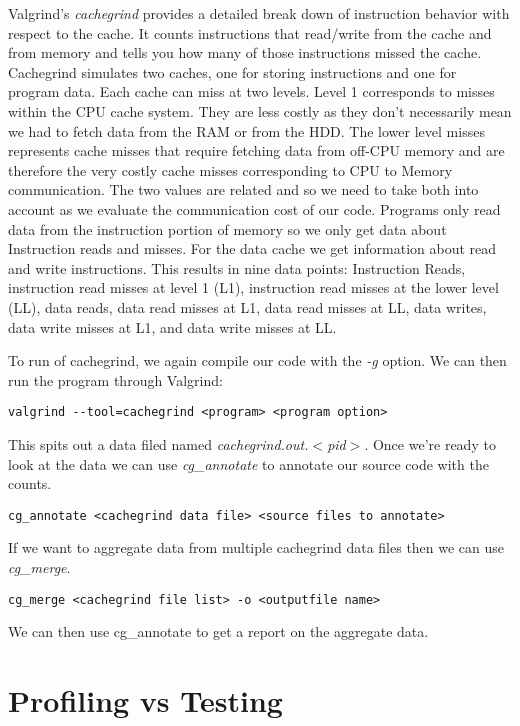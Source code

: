 \documentclass[]{tufte-handout}
\begin{document}
Valgrind's \textit{cachegrind} provides a detailed break down of instruction behavior with respect to the cache. It counts instructions that read/write from the cache and from memory and tells you how many of those instructions missed the cache. Cachegrind simulates two caches, one for storing instructions and one for program data.  Each cache can miss at two levels. Level 1 corresponds to misses within the CPU cache system. They are less costly as they don't necessarily mean we had to fetch data from the RAM or from the HDD.  The lower level misses represents cache misses that require fetching data from off-CPU memory and are therefore the very costly cache misses corresponding to CPU to Memory communication.  The two values are related and so we need to take both into account as we evaluate the communication cost of our code. Programs only read data from the instruction portion of memory so we only get data about Instruction reads and misses. For the data cache we get information about read and write instructions. This results in nine data points: Instruction Reads, instruction read misses at level 1 (L1), instruction read misses at the lower level (LL), data reads, data read misses at L1, data read misses at LL, data writes, data write misses at L1, and data write misses at LL.

To run of cachegrind, we again compile our code with the \textit{-g} option. We can then run the program through Valgrind:
\begin{verbatim}
valgrind --tool=cachegrind <program> <program option>
\end{verbatim}
This spits out a data filed named \textit{cachegrind.out.$<$pid$>$}. Once we're ready to look at the data we can use \textit{cg\_annotate} to annotate our source code with the counts.
\begin{verbatim}
cg_annotate <cachegrind data file> <source files to annotate>
\end{verbatim}
If we want to aggregate data from multiple cachegrind data files then we can use \textit{cg\_merge}.
\begin{verbatim}
cg_merge <cachegrind file list> -o <outputfile name>
\end{verbatim}
We can then use cg\_annotate to get a report on the aggregate data.

\section{Profiling vs Testing}
\end{document}
